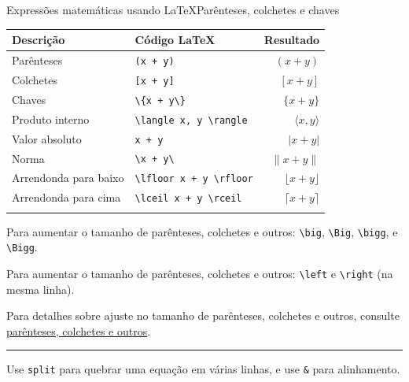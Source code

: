 \documentclass[
  10pt,
  ignorenonframetext,
]{beamer}
\newcommand*{\regrafina}{\rule{\textwidth}{0.5pt}}
\begin{document}
\begin{frame}[fragile]{Expressões matemáticas usando
\LaTeX\newline Parênteses, colchetes e chaves}
\protect\hypertarget{expressuxf5es-matemuxe1ticas-usando-paruxeanteses-colchetes-e-chaves}{}
\normalsize

\begin{longtable}[]{@{}llr@{}}
\toprule\noalign{}
Descrição & Código \LaTeX & Resultado \\
\midrule\noalign{}
\endhead
Parênteses & \texttt{(x\ +\ y)} & \((x+y)\) \\
Colchetes & \texttt{{[}x\ +\ y{]}} & \([x+y]\) \\
Chaves & \texttt{\textbackslash{}\{x\ +\ y\textbackslash{}\}} &
\(\{x+y\}\) \\
Produto interno &
\texttt{\textbackslash{}langle\ x,\ y\ \textbackslash{}rangle} &
\(\langle x, y \rangle\) \\
Valor absoluto & \texttt{\textbar{}x\ +\ y\textbar{}} & \(|x + y|\) \\
Norma &
\texttt{\textbackslash{}\textbar{}x\ +\ y\textbackslash{}\textbar{}} &
\(\|x+y\|\) \\
Arrendonda para baixo &
\texttt{\textbackslash{}lfloor\ x\ +\ y\ \textbackslash{}rfloor} &
\(\lfloor x + y \rfloor\) \\
Arrendonda para cima &
\texttt{\textbackslash{}lceil\ x\ +\ y\ \textbackslash{}rceil} &
\(\lceil x + y \rceil\) \\
\bottomrule\noalign{}
\end{longtable}
\end{frame}

\begin{frame}[fragile]
Para aumentar o tamanho de parênteses, colchetes e outros:
\texttt{\textbackslash{}big}, \texttt{\textbackslash{}Big},
\texttt{\textbackslash{}bigg}, e \texttt{\textbackslash{}Bigg}.

Para aumentar o tamanho de parênteses, colchetes e outros:
\texttt{\textbackslash{}left} e \texttt{\textbackslash{}right} (na mesma
linha).

Para detalhes sobre ajuste no tamanho de parênteses, colchetes e outros,
consulte
\href{https://www.overleaf.com/learn/latex/Brackets_and_Parentheses}{parênteses,
colchetes e outros}.

\regrafina

Use \texttt{split} para quebrar uma equação em várias linhas, e use
\texttt{\&} para alinhamento.
\end{frame}
\end{document}
